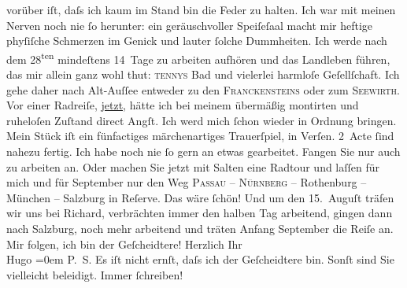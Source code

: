 \begin{ledgroupsized}[t]{13cm}
               vorüber iſt, daſs {\pb}ich kaum im
               Stand bin die Feder zu halten.\pend
           \pstart
           Ich war mit meinen Nerven noch nie ſo herunter: ein geräuschvoller Speiſeſaal macht
               mir heftige phyſiſche Schmerzen im Genick und lauter ſolche Dummheiten. Ich werde
               nach dem 28\textsuperscript{ten} mindeſtens 14 Tage zu arbeiten aufhören {\pb}und das Landleben führen, das mir allein ganz wohl thut: \textsc{tennys} Bad und vielerlei harmloſe Geſellſchaft. Ich gehe daher nach Alt-Auſſee entweder zu den \textsc{Franckensteins} oder zum \textsc{Seewirth}. Vor einer Radreiſe, \uline{jetzt}, hätte ich bei
               meinem übermäßig montirten und ruheloſen Zuſtand direct Angſt. {\pb}Ich werd mich ſchon wieder in
               Ordnung bringen.\pend
           \pstart
           Mein Stück iſt ein fünfactiges
               märchenartiges Trauerſpiel, in Verſen. 2 Acte ſind nahezu fertig. Ich habe noch nie
               ſo gern an etwas gearbeitet. Fangen Sie nur auch zu arbeiten an.\pend
           \pstart
           Oder machen Sie jetzt mit Salten eine Radtour
                  {\pb}und laſſen für mich und für
                  September nur den Weg \textsc{Passau} – \textsc{Nürnberg} – Rothenburg – München – Salzburg in
               Reſerve. Das wäre ſchön!\pend
           \pstart
           Und um den 15. Auguſt träfen wir uns bei Richard, verbrächten immer den halben Tag arbeitend, gingen
               dann {\pb}nach Salzburg, noch mehr arbeitend und träten Anfang
                  September die Reiſe an. Mir folgen, ich bin der Geſcheidtere!\pend
           \pstart
           Herzlich Ihr{\\[\baselineskip]}\spacefill\mbox{Hugo}\pend
           \leftskip=0em{}\pstart
           \noindent{}\textsc{P. S.}\pend
           \pstart
           Es iſt nicht ernſt, daſs ich der Geſcheidtere bin. Sonſt sind Sie vielleicht
                  beleidigt.\pend
           \pstart
           \centering{}{\pb}Immer ſchreiben!\pend
           

\end{ledgroupsized}
